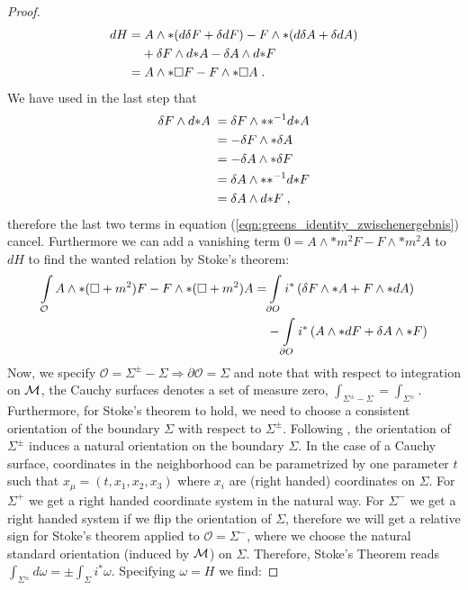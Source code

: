 \begin{proof}
\begin{align}
 dH &= A \wedge * ( d \delta F + \delta d F) - F \wedge * (d\delta A + \delta d A ) \notag \\
  &\phantom{M}+ \delta F \wedge d{*A} - \delta A \wedge d{* F} \label{eqn:greens_identity_zwischenergebnis}  \\
  &= A \wedge * \square F - F \wedge * \square A \;.
\end{align}
We have used in the last step that
\begin{align}
 \delta F \wedge d{* A}\; &=  \delta F \wedge {* *^{-1}}d{*A} \notag\\
 &=  - \delta F \wedge * \delta A \notag\\
 &=  - \delta A \wedge * \delta F \notag\\
 &=  \delta A \wedge {**^{-1}}{d*}F \notag\\
 &= \delta A \wedge d{*F} \;,
\end{align}
therefore the last two terms in equation (\ref{eqn:greens_identity_zwischenergebnis}) cancel. Furthermore we can add a vanishing term $0 = A \wedge * m^2 F - F \wedge * m^2 A$ to $dH$ to find the wanted relation by Stoke's theorem:
\begin{align}
 \int\limits_\mathcal O A \wedge * (\square + m^2) F - F \wedge * (\square + m^2) A
 =& \int\limits_{\partial O} i^*\left( \delta F \wedge *A + F \wedge *dA\right) \notag \\
 &- \int\limits_{\partial O} i^*\left( A \wedge *dF + \delta A \wedge *F\right)
\end{align}
Now, we specify $\mathcal O = \Sigma^\pm - \Sigma \Rightarrow \partial \mathcal O = \Sigma$ and note that with respect to integration on $\mathcal{M}$, the Cauchy surfaces denotes a set of measure zero, $\int_{\Sigma^\pm - \Sigma} = \int_{\Sigma^\pm}$. Furthermore, for Stoke's theorem to hold, we need to choose a consistent orientation of the boundary $\Sigma$ with respect to $\Sigma^\pm$. Following \cite[Appendix B.2]{wald_GR}, the orientation of $\Sigma^\pm$ induces a natural orientation on the boundary $\Sigma$. In the case of a Cauchy surface, coordinates in the neighborhood can be parametrized by one parameter $t$ such that $x_\mu=(t, x_1,x_2,x_3)$ where $x_i$ are (right handed) coordinates on $\Sigma$. For $\Sigma^+$ we get a right handed coordinate system in the natural way. For $\Sigma^-$ we get a right handed system if we flip the orientation of $\Sigma$, therefore we will get a relative sign for Stoke's theorem applied to $\mathcal O = \Sigma^-$, where we choose the natural standard orientation (induced by $\mathcal{M}$) on $\Sigma$. Therefore,  Stoke's Theorem reads $\int_{\Sigma^{\pm}} d\omega = \pm \int_{\Sigma} i^* \omega$. Specifying $\omega = H$ we find:

\end{proof}
